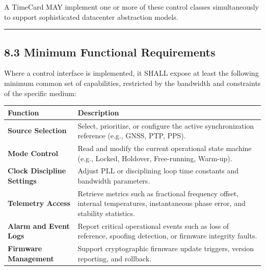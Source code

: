 A TimeCard MAY implement one or more of these control classes
simultaneously to support sophisticated datacenter abstraction models.

\begin{center}\rule{0.5\linewidth}{0.5pt}\end{center}

\subsection{8.3 Minimum Functional
Requirements}\label{minimum-functional-requirements}

Where a control interface is implemented, it SHALL expose at least the
following minimum common set of capabilities, restricted by the
bandwidth and constraints of the specific medium:

{\def\LTcaptype{none} %
\begin{longtable}[]{@{}
  >{\raggedright\arraybackslash}p{}
  >{\raggedright\arraybackslash}p{}@{}}
\toprule\noalign{}
\begin{minipage}[b]{\linewidth}\raggedright
Function
\end{minipage} & \begin{minipage}[b]{\linewidth}\raggedright
Description
\end{minipage} \\
\midrule\noalign{}
\endhead
\bottomrule\noalign{}
\endlastfoot
\textbf{Source Selection} & Select, prioritize, or configure the active
synchronization reference (e.g., GNSS, PTP, PPS). \\
\textbf{Mode Control} & Read and modify the current operational state
machine (e.g., Locked, Holdover, Free-running, Warm-up). \\
\textbf{Clock Discipline Settings} & Adjust PLL or disciplining loop
time constants and bandwidth parameters. \\
\textbf{Telemetry Access} & Retrieve metrics such as fractional
frequency offset, internal temperatures, instantaneous phase error, and
stability statistics. \\
\textbf{Alarm and Event Logs} & Report critical operational events such
as loss of reference, spoofing detection, or firmware integrity
faults. \\
\textbf{Firmware Management} & Support cryptographic firmware update
triggers, version reporting, and rollback. \\
\end{longtable}
}


